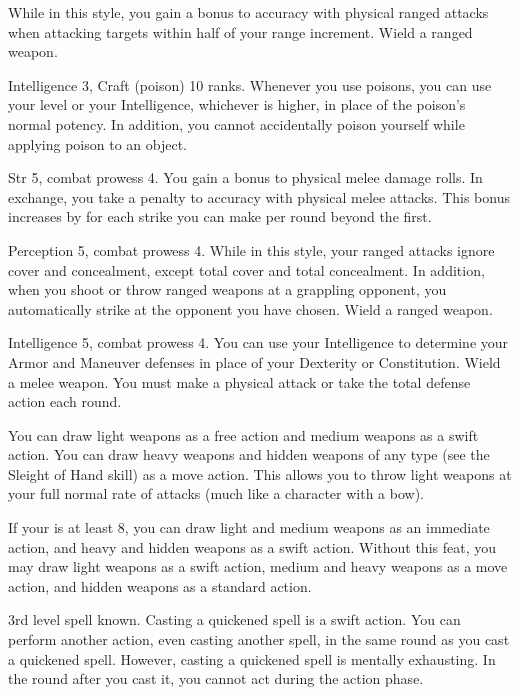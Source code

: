 \featben While in this style, you gain a  bonus to accuracy with physical ranged attacks when attacking targets within half of your range increment.
\stylereq Wield a ranged weapon.

\featpres Intelligence 3, Craft (poison) 10 ranks.
\featben Whenever you use poisons, you can use your level or your Intelligence, whichever is higher, in place of the poison's normal potency.
In addition, you cannot accidentally poison yourself while applying poison to an object.

\featpres Str 5, combat prowess 4.
\featben You gain a  bonus to physical melee damage rolls.
In exchange, you take a  penalty to accuracy with physical melee attacks.
This bonus increases by  for each strike you can make per round beyond the first.

\featpres Perception 5, combat prowess 4.
\featben While in this style, your ranged attacks ignore cover and concealment, except total cover and total concealment.
In addition, when you shoot or throw ranged weapons at a grappling opponent, you automatically strike at the opponent you have chosen.
\stylereq Wield a ranged weapon.

\featpres Intelligence 5, combat prowess 4.
\featben You can use your Intelligence to determine your Armor and Maneuver defenses in place of your Dexterity or Constitution.
\stylereq Wield a melee weapon.
You must make a physical attack or take the total defense action each round.

\featben You can draw light weapons as a free action and medium weapons as a swift action.
You can draw heavy weapons and hidden weapons of any type (see the Sleight of Hand skill) as a move action.
This allows you to throw light weapons at your full normal rate of attacks (much like a character with a bow).

If your  is at least 8, you can draw light and medium weapons as an immediate action, and heavy and hidden weapons as a swift action.
Without this feat, you may draw light weapons as a swift action, medium and heavy weapons as a move action, and hidden weapons as a standard action.

\label{Quicken Spell}
\featpre 3rd level spell known.
\featben Casting a quickened spell is a swift action.
You can perform another action, even casting another spell, in the same round as you cast a quickened spell.
However, casting a quickened spell is mentally exhausting.
In the round after you cast it, you cannot act during the action phase.

